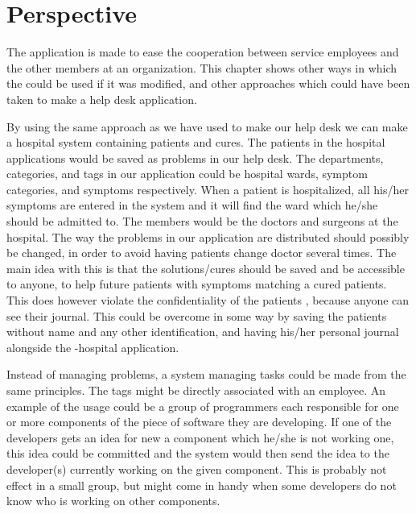 \chapter{Perspective}
\label{chap:perspective}
\emptyTop{}
The \hdesk[] application is made to ease the cooperation between service employees and the other members at an organization.
This chapter shows other ways in which the \hdesk[] could be used if it was modified, and other approaches which could have been taken to make a help desk application.

By using the same approach as we have used to make our help desk we can make a hospital system containing patients and cures.
The patients in the hospital applications would be saved as problems in our help desk.
The departments, categories, and tags in our application could be hospital wards, symptom categories, and symptoms respectively.
When a patient is hospitalized, all his/her symptoms are entered in the system and it will find the ward which he/she should be admitted to.
The \astaff[] members would be the doctors and surgeons at the hospital.
The way the problems in our application are distributed should possibly be changed, in order to avoid having patients change doctor several times.
The main idea with this is that the solutions/cures should be saved and be accessible to anyone, to help future patients with symptoms matching a cured patients.
This does however violate the confidentiality of the patients \cite{ama}, because anyone can see their journal.
This could be overcome in some way by saving the patients without name and any other identification, and having his/her personal journal alongside the \hdesk[]-hospital application.

Instead of managing problems, a system managing tasks could be made from the same principles.
The tags might be directly associated with an employee.
An example of the usage could be a group of programmers each responsible for one or more components of the piece of software they are developing.
If one of the developers gets an idea for new a component which he/she is not working one, this idea could be committed and the system would then send the idea to the developer(s) currently working on the given component.
This is probably not effect in a small group, but might come in handy when some developers do not know who is working on other components.

